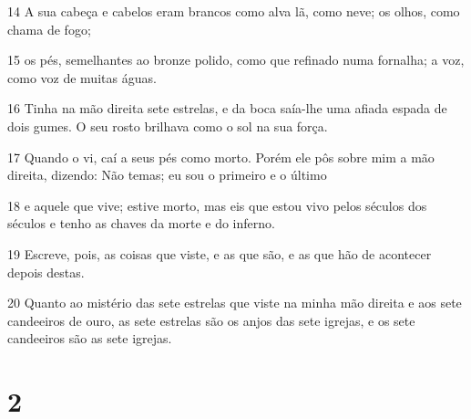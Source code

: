 \par 14 A sua cabeça e cabelos eram brancos como alva lã, como neve; os olhos, como chama de fogo;
\par 15 os pés, semelhantes ao bronze polido, como que refinado numa fornalha; a voz, como voz de muitas águas.
\par 16 Tinha na mão direita sete estrelas, e da boca saía-lhe uma afiada espada de dois gumes. O seu rosto brilhava como o sol na sua força.
\par 17 Quando o vi, caí a seus pés como morto. Porém ele pôs sobre mim a mão direita, dizendo: Não temas; eu sou o primeiro e o último
\par 18 e aquele que vive; estive morto, mas eis que estou vivo pelos séculos dos séculos e tenho as chaves da morte e do inferno.
\par 19 Escreve, pois, as coisas que viste, e as que são, e as que hão de acontecer depois destas.
\par 20 Quanto ao mistério das sete estrelas que viste na minha mão direita e aos sete candeeiros de ouro, as sete estrelas são os anjos das sete igrejas, e os sete candeeiros são as sete igrejas.

\chapter{2}

